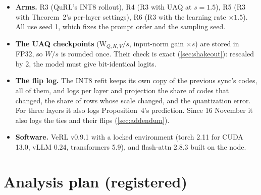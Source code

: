 \documentclass[11pt]{article}
\begin{document}
\begin{itemize}
\item \textbf{Arms.} R3 (QuRL's INT8 rollout), R4 (R3 with UAQ at $s=1.5$), R5 (R3 with Theorem~2's per-layer settings), R6 (R3 with the learning rate $\times1.5$). All use seed 1, which fixes the prompt order and the sampling seed.
\item \textbf{The UAQ checkpoints} (W$_{Q,K,V}/s$, input-norm gain $\times s$) are stored in FP32, so $W/s$ is rounded once. Their check is exact (\cref{sec:shakeout}): rescaled by 2, the model must give bit-identical logits.
\item \textbf{The flip log.} The INT8 refit keeps its own copy of the previous sync's codes, all of them, and logs per layer and projection the share of codes that changed, the share of rows whose scale changed, and the quantization error. For three layers it also logs Proposition~4's prediction. Since 16 November it also logs the ties and their flips (\cref{sec:addendum}).
\item \textbf{Software.} VeRL v0.9.1 \citep{sheng2025hybridflow} with a locked environment (torch 2.11 for CUDA 13.0, vLLM 0.24, transformers 5.9), and flash-attn 2.8.3 built on the node.
\end{itemize}

\section{Analysis plan (registered)}\label{sec:plan}
\end{document}

